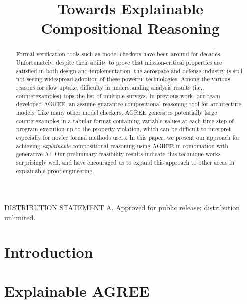 \documentclass[conference]{IEEEtran}
\begin{document}
\title{Towards Explainable Compositional Reasoning}

\author{
	}



\maketitle

\begin{abstract}

Formal verification tools such as model checkers have been around for decades.  Unfortunately, despite their ability to prove that mission-critical properties are satisfied in both design and implementation, the aerospace and defense industry is still not seeing widespread adoption of these powerful technologies. 
%
Among the various reasons for slow uptake, difficulty in understanding analysis results (i.e., counterexamples) tops the list of multiple surveys.
%
In previous work, our team developed AGREE, an assume-guarantee compositional reasoning tool for architecture models.  Like many other model checkers, AGREE generates potentially large counterexamples in a tabular format containing variable values at each time step of program execution up to the property violation, which can be difficult to interpret, especially for novice formal methods users.
In this paper, we present our approach for achieving \textit{explainable} compositional reasoning using AGREE in combination with generative AI.  Our preliminary feasibility results indicate this technique works surprisingly well, and have encouraged us to expand this approach to other areas in explainable proof engineering.  
	

\end{abstract}

DISTRIBUTION STATEMENT A. Approved for public release: distribution unlimited.

\section{Introduction}
\label{sec:introduction}


\section{Explainable AGREE}
\label{sec:agree}

\end{document}
